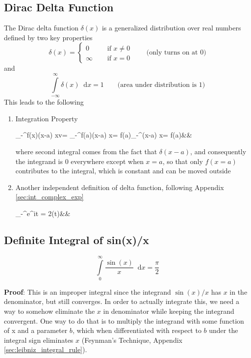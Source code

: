 \documentclass[11pt, a4paper]{article}
\newcommand{\diff}{\mathop{}\!\mathrm{d}}
\newcommand{\dx}{\diff x}
\newcommand{\domega}{\diff \omega}
\newcommand{\dint}[2]{\int \limits_{#1}^{#2}}  %
\newcommand{\intinfty}{\dint{-\infty}{\infty}}	%
\newcommand{\intzerotoinfty}{\dint{0}{\infty}}	%
\begin{document}
\subsection{Dirac Delta Function}\label{sec:delta_func}
The Dirac delta function $\delta(x)$ is a generalized distribution over real numbers defined by two key properties
\begin{equation}\label{eq:delta_func_def}
	\delta (x) = \left\{
	\begin{array}{ll}
		0  &  \quad \text{ if } x \neq 0 \\
		\infty & \quad \text{ if } x = 0
	\end{array}
	\right. \qquad \text{(only turns on at $0$)}
\end{equation}
and
\begin{equation}\label{eq:delta_func_area}
	\intinfty \delta (x) \dx = 1 \qquad \text{(area under distribution is $1$)}
\end{equation}
This leads to the following
\begin{enumerate}
	\item Integration Property
	\begin{flalign}\label{eq:delta_func_integration_value}
		\intinfty f(x)\delta (x-a) \dx v= \intinfty f(a)\delta (x-a) \dx = f(a)\intinfty \delta (x-a) \dx = f(a)&&
	\end{flalign}
	where second integral comes from the fact that $\delta (x - a)$, and consequently the integrand is $0$ everywhere except when $x=a$, so that only $f(x=a)$ contributes to the integral, which is constant and can be moved outside
	\item Another independent definition of delta function, following Appendix \ref{sec:int_complex_exp}
	\begin{flalign}\label{eq:delta_func_def_complex_exp}
		\intinfty e^{i\omega t} \domega = 2\pi \delta (t)&&
	\end{flalign}
\end{enumerate}

\subsection{Definite Integral of sin(x)/x}\label{sec:int_sinx_by_x}
\begin{equation}\label{eq:int_sinx_by_x}
\intzerotoinfty \frac{\sin(x)}{x} \dx = \frac{\pi}{2}
\end{equation}

\vspace{4pt}
\textbf{Proof}: This is an improper integral since the integrand $\sin(x) / x$ has $x$ in the denominator, but still converges. In order to actually integrate this, we need a way to somehow eliminate the $x$ in denominator while keeping the integrand convergent. One way to do that is to multiply the integrand with some function of x and a parameter $b$, which when differentiated with respect to $b$ under the integral sign eliminates $x$ (Feynman's Technique, Appendix \ref{sec:leibniz_integral_rule}).
\end{document}
